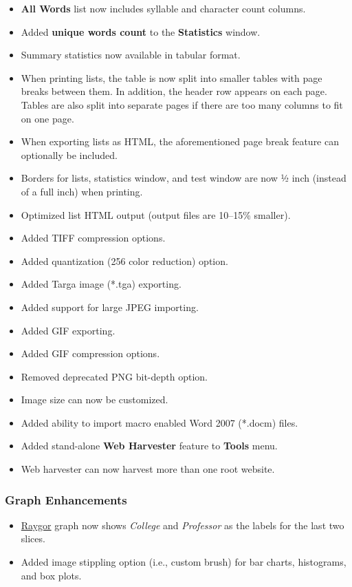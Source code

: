 \documentclass[
]{book}
\providecommand{\tightlist}{%
  \setlength{\itemsep}{0pt}\setlength{\parskip}{0pt}}
\theoremstyle{definition}
\theoremstyle{definition}
\theoremstyle{definition}
\theoremstyle{definition}
\theoremstyle{remark}
\begin{document}
\begin{itemize}
\tightlist
\item
  \textbf{All Words} list now includes syllable and character count columns.
\item
  Added \textbf{unique words count} to the \textbf{Statistics} window.
\item
  Summary statistics now available in tabular format.
\item
  When printing lists, the table is now split into smaller tables with page breaks between them. In addition, the header row appears on each page. Tables are also split into separate pages if there are too many columns to fit on one page.
\item
  When exporting lists as HTML, the aforementioned page break feature can optionally be included.
\item
  Borders for lists, statistics window, and test window are now ½ inch (instead of a full inch) when printing.
\item
  Optimized list HTML output (output files are 10--15\% smaller).
\item
  Added TIFF compression options.
\item
  Added quantization (256 color reduction) option.
\item
  Added Targa image (*.tga) exporting.
\item
  Added support for large JPEG importing.
\item
  Added GIF exporting.
\item
  Added GIF compression options.
\item
  Removed deprecated PNG bit-depth option.
\item
  Image size can now be customized.
\item
  Added ability to import macro enabled Word 2007 (*.docm) files.
\item
  Added stand-alone \textbf{Web Harvester} feature to \textbf{Tools} menu.
\item
  Web harvester can now harvest more than one root website.
\end{itemize}

\hypertarget{graph-enhancements-4}{%
\subsubsection*{Graph Enhancements}\label{graph-enhancements-4}}

\begin{itemize}
\tightlist
\item
  \protect\hyperlink{raygor-test}{Raygor} graph now shows \emph{College} and \emph{Professor} as the labels for the last two slices.
\item
  Added image stippling option (i.e., custom brush) for bar charts, histograms, and box plots.
\end{itemize}
\end{document}

